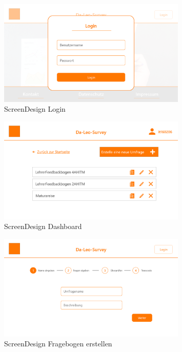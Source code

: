 \begin{figure}[H]
    \includegraphics[width=0.8\textwidth]{pics/Login.png}
    \centering
    \caption{ScreenDesign Login}
    \label{fig:screenDesign1}
\end{figure}
    
\begin{figure}[H]
    \includegraphics[width=0.8\textwidth]{pics/Dashboard.png}
    \centering
    \caption{ScreenDesign Dashboard}
\end{figure}

\begin{figure}[H]
    \includegraphics[width=0.8\textwidth]{pics/Erstellen_Umfarage_1.png}
    \centering
    \caption{ScreenDesign Fragebogen erstellen}
\end{figure}

